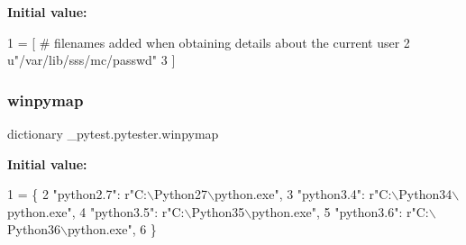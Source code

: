 {\bfseries Initial value\+:}
\begin{DoxyCode}
1 =  [  \textcolor{comment}{# filenames added when obtaining details about the current user}
2     \textcolor{stringliteral}{u"/var/lib/sss/mc/passwd"}
3 ]
\end{DoxyCode}
\mbox{\label{namespace__pytest_1_1pytester_af05ae72eb0be837167b0e67a11e4f2c7}} 
\subsubsection{\texorpdfstring{winpymap}{winpymap}}
{\footnotesize\ttfamily dictionary \+\_\+pytest.\+pytester.\+winpymap}

{\bfseries Initial value\+:}
\begin{DoxyCode}
1 =  \{
2     \textcolor{stringliteral}{"python2.7"}: \textcolor{stringliteral}{r"C:\(\backslash\)Python27\(\backslash\)python.exe"},
3     \textcolor{stringliteral}{"python3.4"}: \textcolor{stringliteral}{r"C:\(\backslash\)Python34\(\backslash\)python.exe"},
4     \textcolor{stringliteral}{"python3.5"}: \textcolor{stringliteral}{r"C:\(\backslash\)Python35\(\backslash\)python.exe"},
5     \textcolor{stringliteral}{"python3.6"}: \textcolor{stringliteral}{r"C:\(\backslash\)Python36\(\backslash\)python.exe"},
6 \}
\end{DoxyCode}
